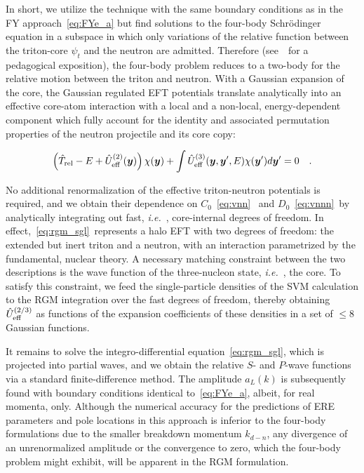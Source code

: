 \documentclass[5p,times]{elsarticle}
\newcommand{\ie}{\textit{i.e.}~}
\newcommand{\ve}[1]{\ensuremath{\boldsymbol{#1}}}
\begin{document}
In short, we utilize the technique with the same boundary conditions as in the FY 
approach~\eqref{eq:FYe_a} but find solutions
to the four-body Schr\"odinger equation in a subspace in which only variations 
of the relative function between the
triton-core $\psi_t$ and the neutron are admitted. Therefore 
(see~\cite{wildermuth1977unified}~for a pedagogical exposition),
the four-body problem reduces to a two-body for the relative 
motion between the triton and neutron.
With a Gaussian expansion of the core, the Gaussian regulated 
EFT potentials translate analytically into an effective
core-atom interaction with a local and a non-local, energy-dependent 
component which fully account for the identity and associated
permutation properties of the neutron projectile and its core copy:

\begin{equation}
\left(\hat{T}_{\rm rel}-E+\hat{U}^{(2)}_{\rm eff}(\ve{y})\right)\chi(\ve{y})+
\int\hat{U}^{(3)}_{\rm eff}(\ve{y},\ve{y}',E)\chi(\ve{y}')d\ve{y}'=0
\quad.\label{eq:rgm_sgl}
\end{equation}

No additional renormalization of the effective triton-neutron potentials 
is required, and we obtain their dependence
on $C_0$~\eqref{eq:vnn}~ and $D_0$~\eqref{eq:vnnn}~by analytically 
integrating out fast, \ie, core-internal degrees of freedom.
In effect,~\eqref{eq:rgm_sgl}~represents a halo EFT with two degrees of freedom: the extended but inert triton
and a neutron, with an interaction parametrized by the fundamental, nuclear theory.
A necessary matching constraint between the two descriptions is the wave function of the three-nucleon state, \ie, the core.
To satisfy this constraint, we feed the single-particle 
densities of the SVM calculation
to the RGM integration over the fast degrees of freedom, thereby obtaining $\hat{U}^{(2/3)}_{\rm eff}$
as functions of the expansion coefficients of these densities in a set of
$\leq8$ Gaussian functions.

It remains to solve the integro-differential equation~\eqref{eq:rgm_sgl}, 
which is projected into partial waves, and we obtain the relative $S$- and $P$-wave functions
via a standard finite-difference method. The amplitude 
$a_L(k)$ is subsequently found with boundary conditions identical to~\eqref{eq:FYe_a},
albeit, for real momenta, only.
Although the numerical accuracy for the predictions of
ERE parameters and pole locations in this approach is inferior to the four-body formulations
due to the smaller breakdown momentum $k_{d-n}$, any divergence of an unrenormalized
amplitude or the convergence to zero, which the four-body problem might exhibit,
will be apparent in the RGM formulation.
\end{document}
